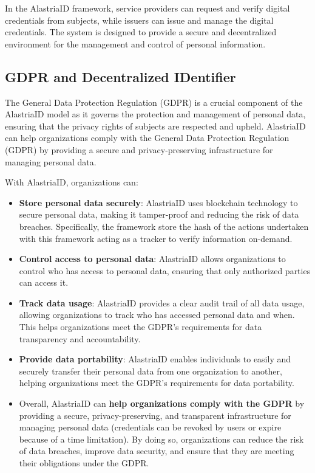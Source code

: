 \documentclass[target=mst,aauheader=]{thud}
\begin{document}
In the AlastriaID framework, service providers can request and verify digital credentials from subjects, while issuers can issue and manage the digital credentials. The system is designed to provide a secure and decentralized environment for the management and control of personal information.

\subsection{GDPR and Decentralized IDentifier}
The General Data Protection Regulation (GDPR) is a crucial component of the AlastriaID model as it governs the protection and management of personal data, ensuring that the privacy rights of subjects are respected and upheld.
AlastriaID can help organizations comply with the General Data Protection Regulation (GDPR) by providing a secure and privacy-preserving infrastructure for managing personal data.

With AlastriaID, organizations can:

\begin{itemize}

    \item \textbf{Store personal data securely}: AlastriaID uses blockchain technology to secure personal data, making it tamper-proof and reducing the risk of data breaches. Specifically, the framework store the hash of the actions undertaken with this framework acting as a tracker to verify information on-demand.
    \item \textbf{Control access to personal data}: AlastriaID allows organizations to control who has access to personal data, ensuring that only authorized parties can access it.
    \item \textbf{Track data usage}: AlastriaID provides a clear audit trail of all data usage, allowing organizations to track who has accessed personal data and when. This helps organizations meet the GDPR's requirements for data transparency and accountability.
    \item \textbf{Provide data portability}: AlastriaID enables individuals to easily and securely transfer their personal data from one organization to another, helping organizations meet the GDPR's requirements for data portability.
    \item Overall, AlastriaID can \textbf{help organizations comply with the GDPR} by providing a secure, privacy-preserving, and transparent infrastructure for managing personal data (credentials can be revoked by users or expire because of a time limitation). By doing so, organizations can reduce the risk of data breaches, improve data security, and ensure that they are meeting their obligations under the GDPR.

\end{itemize}
\end{document}
